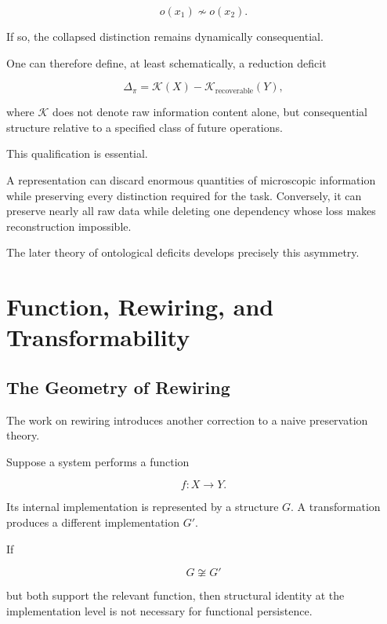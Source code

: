\documentclass[11pt]{article}
\theoremstyle{remark}
\begin{document}
\begin{equation}
o(x_1)\not\sim o(x_2).
\end{equation}

If so, the collapsed distinction remains dynamically consequential.

One can therefore define, at least schematically, a reduction deficit

\begin{equation}
\Delta_{\pi}
=
\mathcal{K}(X)-\mathcal{K}_{\mathrm{recoverable}}(Y),
\end{equation}

where $\mathcal{K}$ does not denote raw information content alone, but consequential structure relative to a specified class of future operations.

This qualification is essential.

A representation can discard enormous quantities of microscopic information while preserving every distinction required for the task. Conversely, it can preserve nearly all raw data while deleting one dependency whose loss makes reconstruction impossible.

The later theory of ontological deficits develops precisely this asymmetry.

\section{Function, Rewiring, and Transformability}

\subsection{The Geometry of Rewiring}

The work on rewiring introduces another correction to a naive preservation theory.

Suppose a system performs a function

\begin{equation}
f:X\rightarrow Y.
\end{equation}

Its internal implementation is represented by a structure $G$. A transformation produces a different implementation $G'$.

If

\begin{equation}
G\not\cong G'
\end{equation}

but both support the relevant function, then structural identity at the implementation level is not necessary for functional persistence.
\end{document}
